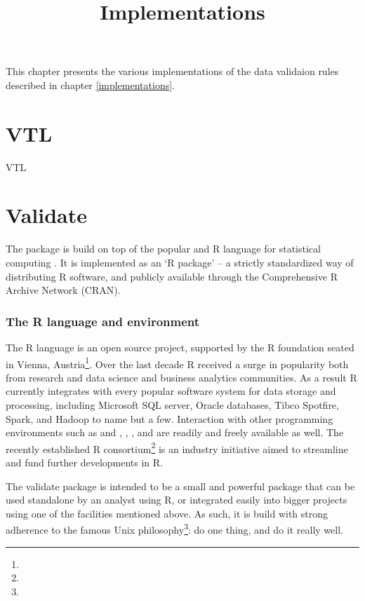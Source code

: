 \title{Implementations}

\vspace{0.6 cm}

\noindent
This chapter presents the various implementations of the data validaion rules described in chapter \ref{implementations}.

\section{VTL}

VTL

\section{Validate}

The  package \citep{loo:2015} is build on top of the popular and
R language for statistical computing \citep{rcore:2015}. It is
implemented as an `R package' -- a strictly standardized way of distributing R
software, and publicly available through the Comprehensive R Archive Network
(CRAN). 

\subsubsection{The R language and environment}
The R language is an open source project, supported by the R foundation seated
in Vienna, Austria\footnote{}.
Over the last decade R received a surge in popularity both from research and
data science and business analytics communities. As a result R currently
integrates with every popular software system for data storage and processing,
including Microsoft SQL server, Oracle databases, Tibco Spotfire, Spark, and
Hadoop to name but a few.  Interaction with other programming environments such
as  and , , , and  are
readily and freely available as well. The recently established R
consortium\footnote{} is an industry
initiative aimed to streamline and fund further developments in R.


The validate package is intended to be a small and powerful package that can be
used standalone by an analyst using R, or integrated easily into bigger
projects using one of the facilities mentioned above. As such, it is build with
strong adherence to the famous Unix
philosophy\footnote{}: do
one thing, and do it really well.


